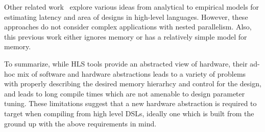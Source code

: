 Other related work~\cite{Deng,Bilavarn,MatchEst,Enzler,Bjureus} explore various ideas from analytical to empirical
models for estimating latency and area of designs in high-level languages. However, these approaches do not
consider complex applications with nested parallelism. Also, this previous work either ignores memory or has a relatively
simple model for memory.

To summarize, while HLS tools provide an abstracted view of hardware, their
ad-hoc mix of software and hardware abstractions leads to a variety of problems
with properly describing the desired memory hierarhcy and control for the design,
and leads to long compile times which are not amenable to design parameter tuning.
These limitations suggest that a new hardware abstraction is required to target
when compiling from high level DSLs, ideally one which is built from the ground up
with the above requirements in mind.

